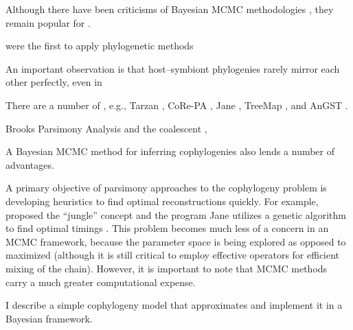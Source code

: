 \documentclass[12pt,letterpaper]{article}
\begin{document}
Although there have been criticisms of Bayesian \ac{MCMC} methodologies \parencites{Felsenstein:2005}{Kolaczkowski:2009}, they remain popular for \parencite{}.

\textcite{Haffner:1988} were the first to apply phylogenetic methods  

An important observation is that host--symbiont phylogenies rarely mirror each other perfectly, even in 

There are a number of , e.g., Tarzan \parencite{Merkle:2005}, CoRe-PA \parencite{Merkle:2010}, Jane \parencite{Conow:2010}, TreeMap \parencite{Charleston:2011}, and AnGST \parencite{David:2011}.

Brooks Parsimony Analysis \parencite{Brooks:1981} and the coalescent \parencite{Rannala:2003} , 

A Bayesian \ac{MCMC} method for inferring cophylogenies also lends a number of advantages.

A primary objective of parsimony approaches to the cophylogeny problem is developing heuristics to find optimal reconstructions quickly. For example, \textcite{Charleston:1998} proposed the \enquote{jungle} concept and the program Jane utilizes a genetic algorithm to find optimal timings \parencite{Conow:2010}. This problem becomes much less of a concern in an \ac{MCMC} framework, because the parameter space is being explored as opposed to maximized (although it is still critical to employ effective operators for efficient mixing of the chain). However, it is important to note that \ac{MCMC} methods carry a much greater computational expense. 

I describe a simple cophylogeny model that approximates and implement it in a Bayesian framework. 
\end{document}
